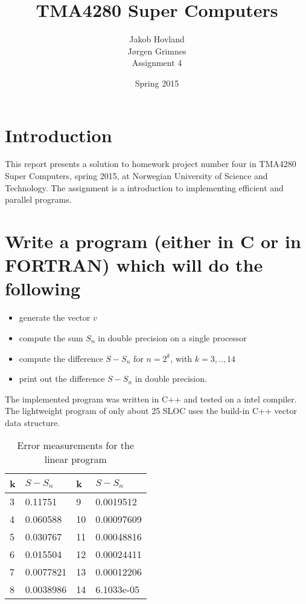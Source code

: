 \documentclass[a4paper]{article} %
\title{TMA4280 Super Computers}
\author{Jakob Hovland\\Jørgen Grimnes\\Assignment 4}
\date{Spring 2015}
\begin{document}
\maketitle
\pagebreak

\section{Introduction}
This report presents a solution to homework project number four in TMA4280 Super Computers, spring 2015, at Norwegian University of Science and Technology. The assignment is a introduction to implementing efficient and parallel programs.

\section{Write a program (either in C or in FORTRAN) which will do the following}
\begin{itemize}
\item generate the vector $v$
\item compute the sum $S_n$ in double precision on a single processor
\item compute the difference $S-S_n$ for $n=2^k$, with $k=3,..,14$
\item print out the difference $S - S_n$ in double precision.
\end{itemize}
The implemented program was written in C++ and tested on a intel compiler. The lightweight program of only about 25 SLOC uses the build-in C++ vector data structure.
\begin{table}[hbt]
  \begin{center}
    \begin{tabular}{|l|l||l|l| }
      \hline
      \textbf{k} & \textbf{$S - S_n$} & \textbf{k} & \textbf{$S - S_n$}\\
      \hline
      3 & 0.11751 & 9 & 0.0019512\\    
      4 & 0.060588 & 10 & 0.00097609\\ 
      5 & 0.030767 & 11 & 0.00048816\\ 
      6 & 0.015504 & 12 & 0.00024411\\ 
      7 & 0.0077821 & 13 & 0.00012206\\
      8 & 0.0038986 & 14 & 6.1033e-05\\
      \hline
    \end{tabular}
  \end{center}
  \caption{Error measurements for the linear program}
\end{table}
\end{document}
